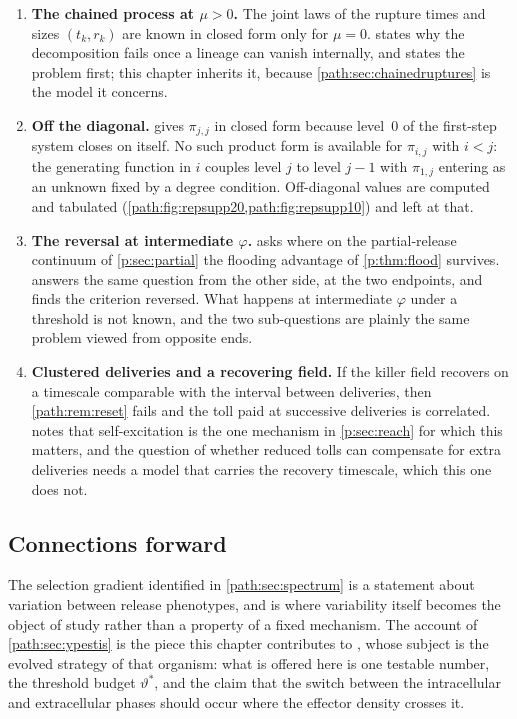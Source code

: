 \begin{enumerate}[leftmargin=1.6em,itemsep=0.25em]
\item \textbf{The chained process at $\mu>0$.} The joint laws of the rupture
times and sizes $(t_k,r_k)$ are known in closed form only for $\mu=0$.
 states why the decomposition fails once a
lineage can vanish internally, and states the problem first; this chapter
inherits it, because \cref{path:sec:chainedruptures} is the model it
concerns.
\item \textbf{Off the diagonal.}  gives
$\pi_{j,j}$ in closed form because level~0 of the first-step system closes
on itself. No such product form is available for $\pi_{i,j}$ with $i<j$: the
generating function in $i$ couples level $j$ to level $j-1$ with $\pi_{1,j}$
entering as an unknown fixed by a degree condition. Off-diagonal values are
computed and tabulated (\cref{path:fig:repsupp20,path:fig:repsupp10}) and
left at that.
\item \textbf{The reversal at intermediate $\varphi$.}
 asks where on the partial-release continuum of
\cref{p:sec:partial} the flooding advantage of \cref{p:thm:flood} survives.
 answers the same question from the other side, at
the two endpoints, and finds the criterion reversed. What happens at
intermediate $\varphi$ under a threshold is not known, and the two
sub-questions are plainly the same problem viewed from opposite ends.
\item \textbf{Clustered deliveries and a recovering field.} If the killer
field recovers on a timescale comparable with the interval between
deliveries, then \cref{path:rem:reset} fails and the toll paid at successive
deliveries is correlated.  notes that
self-excitation is the one mechanism in \cref{p:sec:reach} for which this
matters, and the question of whether reduced tolls can compensate for extra
deliveries needs a model that carries the recovery timescale, which this one
does not.
\end{enumerate}

\subsection{Connections forward}
\label{path:sec:forward}

The selection gradient identified in \cref{path:sec:spectrum} is a
statement about variation between release phenotypes, and \ChEvo{} is where
variability itself becomes the object of study rather than a property of a
fixed mechanism. The \yp{} account of \cref{path:sec:ypestis} is the piece
this chapter contributes to , whose
subject is the evolved strategy of that organism: what is offered here is
one testable number, the threshold budget $\vartheta^{\ast}$, and the claim
that the switch between the intracellular and extracellular phases should
occur where the effector density crosses it.

\FloatBarrier
